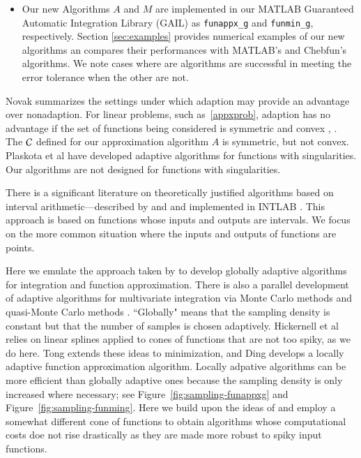 \documentclass[review]{elsarticle}
\theoremstyle{definition}
\newcommand{\funappxg}{\texttt{funappx\_g}\xspace}
\newcommand{\funming}{\texttt{funmin\_g\xspace}}
\begin{document}
\begin{itemize}
\item Our new Algorithms $A$ and $M$ are implemented in our MATLAB Guaranteed Automatic Integration Library (GAIL) \cite{ChoEtal15a}  as \funappxg and \funming, respectively.   Section \ref{sec:examples} provides numerical examples of our new algorithms an compares their performances with MATLAB's  and Chebfun's algorithms.  We note cases where are algorithms are successful in meeting the error tolerance when the other are not.

\end{itemize}

Novak \cite{Nov96a} summarizes the settings under which adaption may provide an advantage over nonadaption.  For linear problems, such as~\eqref{appxprob}, adaption has no advantage if the set of functions being considered is symmetric and convex  \cite[Theorem 1]{Nov96a}, \cite[Chapter 4, Theorem 5.2.1]{TraWasWoz88}.  The $\mathcal{C}$ defined for our approximation algorithm $A$ is symmetric, but not convex.  Plaskota et al \cite{PlaEtal08a} have developed adaptive algorithms for functions with singularities.  Our algorithms are not designed for functions with singularities.

There is a significant literature on theoretically justified algorithms based on interval arithmetic---described by \cite{MoKeCl09} and \cite{Rum10a} and implemented in INTLAB \cite{Rum99a}.  This approach is based on functions whose inputs and outputs are intervals.  We focus on the more common situation where the inputs and outputs of functions are points.

Here we emulate the approach taken by \cite{HicEtal14b} to develop globally adaptive algorithms for integration and function approximation.  There is also a parallel development of adaptive algorithms for multivariate integration via Monte Carlo methods \citep{HicEtal14a, Jia16a} and quasi-Monte Carlo methods \citep{HicJim16a,JimHic16a}.  ``Globally" means that the sampling density is constant but that the number of samples is chosen adaptively.  Hickernell et al \cite{HicEtal14b} relies on linear splines applied to cones of functions that are not too spiky, as we do here.  Tong \cite{Ton14a} extends these ideas to minimization, and Ding \cite{Din15a} develops a locally adaptive function approximation algorithm.  Locally adpative algorithms can be more efficient than globally adaptive ones because the sampling density is only increased where necessary; see Figure~\ref{fig:sampling-funappxg} and Figure~\ref{fig:sampling-funming}. Here we build upon the ideas of \cite{Din15a} and employ a somewhat different cone of functions to obtain algorithms whose computational costs doe not rise drastically as they are made more robust to spiky input functions.  
\end{document}
